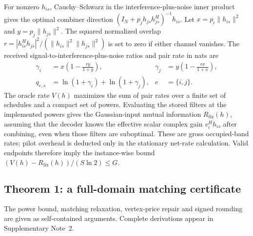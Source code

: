 \documentclass[lineno,pdflatex,sn-nature]{sn-jnl}
\begin{document}
For nonzero \(h_{is}\), Cauchy--Schwarz in the interference-plus-noise inner product gives the optimal combiner direction \((I_N+p_j h_{js}h_{js}^{H})^{-1}h_{is}\). Let \(x=p_i\|h_{is}\|^2\) and \(y=p_j\|h_{js}\|^2\). The squared normalized overlap \(r=|h_{is}^{H}h_{js}|^2/(\|h_{is}\|^2\|h_{js}\|^2)\) is set to zero if either channel vanishes. The received signal-to-interference-plus-noise ratios and pair rate in nats are
\begin{equation}
\begin{aligned}
\gamma_i &= x\left(1-\frac{r y}{1+y}\right), &
\gamma_j &= y\left(1-\frac{r x}{1+x}\right),\\
q_{e,s} &= \ln(1+\gamma_i)+\ln(1+\gamma_j), & e&=\{i,j\}.
\end{aligned}
\label{eq:sinr}
\end{equation}
The oracle rate \(V(h)\) maximizes the sum of pair rates over a finite set of schedules and a compact set of powers. Evaluating the stored filters at the implemented powers gives the Gaussian-input mutual information \({R_{\mathrm{fix}}}(h)\), assuming that the decoder knows the effective scalar complex gain \(v_i^Hh_{is}\) after combining, even when those filters are suboptimal. These are gross occupied-band rates; pilot overhead is deducted only in the stationary net-rate calculation. Valid endpoints therefore imply the instance-wise bound \((V(h)-{R_{\mathrm{fix}}}(h))/(S\ln 2)\leq G\).

\subsection*{Theorem 1: a full-domain matching certificate}
The power bound, matching relaxation, vertex-price repair and signed rounding are given as self-contained arguments. Complete derivations appear in Supplementary Note~2.
\end{document}
